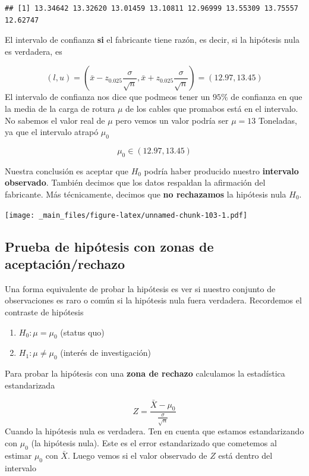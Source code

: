 \documentclass[
]{book}
\providecommand{\tightlist}{%
  \setlength{\itemsep}{0pt}\setlength{\parskip}{0pt}}
\begin{document}
\begin{verbatim}
## [1] 13.34642 13.32620 13.01459 13.10811 12.96999 13.55309 13.75557 12.62747
\end{verbatim}

El intervalo de confianza \textbf{si} el fabricante tiene razón, es decir, si la hipótesis nula es verdadera, es

\[(l,u)=(\bar{x}-z_{0.025} \frac{\sigma}{\sqrt{n}}, \bar{x}+z_{0.025} \frac{\sigma}{ \sqrt{n}})= (12.97,13.45)\]
El intervalo de confianza nos dice que podmeos tener un \(95\%\) de confianza en que la media de la carga de rotura \(\mu\) de los cables que promabos está en el intervalo. No sabemos el valor real de \(\mu\) pero vemos un valor podría ser \(\mu=13\) Toneladas, ya que el intervalo atrapó \(\mu_0\)

\[\mu_0\in (12.97,13.45)\]

Nuestra conclusión es aceptar que \(H_0\) podría haber producido nuestro \textbf{intervalo observado}. También decimos que los datos respaldan la afirmación del fabricante. Más técnicamente, decimos que \textbf{no rechazamos} la hipótesis nula \(H_0\).

\texttt{[image: \_main\_files/figure-latex/unnamed-chunk-103-1.pdf]}

\hypertarget{prueba-de-hipuxf3tesis-con-zonas-de-aceptaciuxf3nrechazo}{%
\subsection{Prueba de hipótesis con zonas de aceptación/rechazo}\label{prueba-de-hipuxf3tesis-con-zonas-de-aceptaciuxf3nrechazo}}

Una forma equivalente de probar la hipótesis es ver si nuestro conjunto de observaciones es raro o común si la hipótesis nula fuera verdadera. Recordemos el contraste de hipótesis

\begin{enumerate}
\def\labelenumi{\alph{enumi}.}
\tightlist
\item
  \(H_0:\mu = \mu_0\) (status quo)
\item
  \(H_1:\mu \neq \mu_0\) (interés de investigación)
\end{enumerate}

Para probar la hipótesis con una \textbf{zona de rechazo} calculamos la estadística estandarizada

\[Z=\frac{\bar{X}-\mu_0}{\frac{\sigma}{\sqrt{n}}}\]
Cuando la hipótesis nula es verdadera. Ten en cuenta que estamos estandarizando con \(\mu_0\) (la hipótesis nula). Este es el error estandarizado que cometemos al estimar \(\mu_0\) con \(\bar{X}\). Luego vemos si el valor observado de \(Z\) está dentro del intervalo
\end{document}
